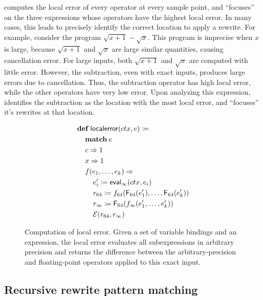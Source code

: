 \documentclass[paper.tex]{subfiles}
\begin{document}
\casio computes the local error of every operator at every sample point,
  and ``focuses'' on the three expressions
  whose operators have the highest local error.
In many cases, this leads \casio to precisely identify the correct location
  to apply a rewrite.
For example, consider the program $\sqrt{x+1} - \sqrt{x}$.
This program is imprecise when $x$ is large,
  because $\sqrt{x+1}$ and $\sqrt{x}$ are large similar quantities,
  causing cancellation error.
For large inputs, both $\sqrt{x+1}$ and $\sqrt{x}$
  are computed with little error.
However, the subtraction, even with exact inputs,
  produces large errors due to cancellation.
Thus, the subtraction operator has high local error,
  while the other operators have very low error.
Upon analyzing this expression, 
  \casio identifies the subtraction as the location with the most local error,
  and ``focuses'' it's rewrites at that location.

\begin{figure}
\begin{footnotesize}
\begin{align*}
  &\!def!\:\|localerror|(ctx, e) \ceq \\
  &\> \!match!\:e \\
  &\> c \tto 1 \\
  &\> x \tto 1 \\
  &\> f(e_1, \dotsc, e_k) \tto \\
  &\> \>  e_i' \ceq \|eval|_\infty(ctx, e_i) \\
  &\> \>  r_{64} \ceq f_{64}(\F_{64}(e_1'), \dotsc, \F_{64}(e_k')) \\
  &\> \>  r_\infty \ceq \F_{64}(f_\infty(e_1', \dotsc, e_k')) \\
  &\> \>  \Err(r_{64}, r_\infty) \\
\end{align*}
\end{footnotesize}
\caption{Computation of local error.
  Given a set of variable bindings and an expression,
  the local error evaluates all subexpressions in arbitrary precision and returns
  the difference between the arbitrary-precision and floating-point operators
  applied to this exact input.}
\label{alg:focus}
\end{figure}

\subsection{Recursive rewrite pattern matching}
\end{document}
